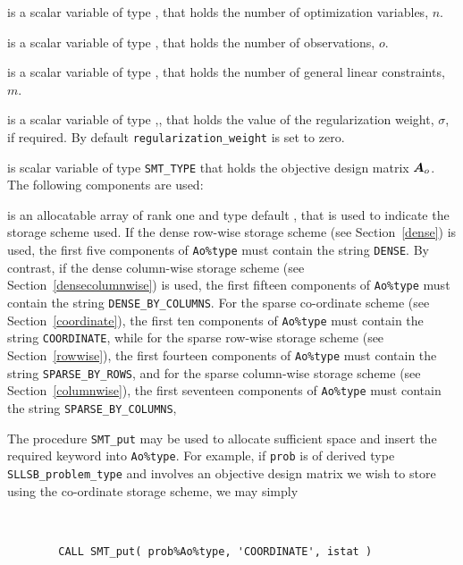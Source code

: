 \documentclass{galahad}
\newcommand{\packagename}{SLLSB}
\begin{document}
\begin{description}

 is a scalar variable of type \integer,
 that holds the number of optimization variables, $n$.

 is a scalar variable of type \integer,
 that holds the number of observations, $o$.

 is a scalar variable of type \integer,
 that holds the number of general linear constraints, $m$.

 is a scalar variable of type \realdp,,
 that holds the value of the regularization weight, $\sigma$, if required.
 By default {\tt regularization\_weight} is set to zero.

 is scalar variable of type {\tt SMT\_TYPE}
that holds the objective design matrix ${\bm{A}}_o$.
The following components are used:

\begin{description}

 is an allocatable array of rank one and type default \character,
that is used to indicate the storage scheme used.
If the dense row-wise storage scheme (see Section~\ref{dense}) is used,
the first five components of {\tt Ao\%type} must contain the
string {\tt DENSE}.
By contrast, if the dense column-wise storage scheme
(see Section~\ref{densecolumnwise}) is used,
the first fifteen components of {\tt Ao\%type} must contain the
string {\tt DENSE\_BY\_COLUMNS}.
For the sparse co-ordinate scheme (see Section~\ref{coordinate}),
the first ten components of {\tt Ao\%type} must contain the
string {\tt COORDINATE}, while
for the sparse row-wise storage scheme (see Section~\ref{rowwise}),
the first fourteen components of {\tt Ao\%type} must contain the
string {\tt SPARSE\_BY\_ROWS},
and for the sparse column-wise storage scheme (see Section~\ref{columnwise}),
the first seventeen components of {\tt Ao\%type} must contain the
string {\tt SPARSE\_BY\_COLUMNS},

The procedure {\tt SMT\_put} may be used to allocate sufficient space and
insert the required keyword into {\tt Ao\%type}. For example,
if {\tt prob} is of derived type {\tt \packagename\_problem\_type}
and involves an objective design matrix we wish to store using the co-ordinate
storage scheme, we may simply
{\tt
\begin{verbatim}
        CALL SMT_put( prob%Ao%type, 'COORDINATE', istat )
\end{verbatim}
}
\noindent


\end{description}
\end{description}
\end{document}
